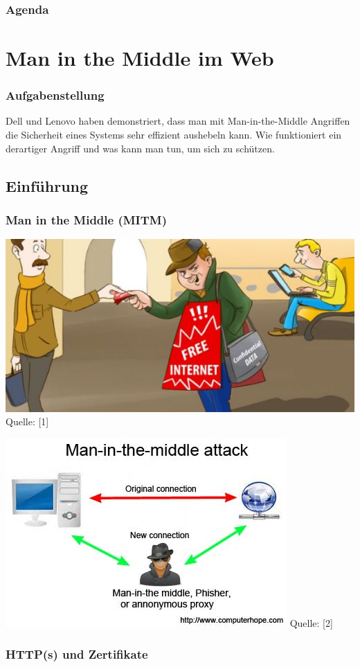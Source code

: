 \documentclass{beamer}
\begin{document}
	\begin{frame} %
		\frametitle{Agenda}
		\tableofcontents
	\end{frame}
	
	\section{Man in the Middle im Web}
	
		\begin{frame}
			\frametitle{Aufgabenstellung}
			Dell und Lenovo haben demonstriert, dass man mit Man-in-the-Middle
			Angriffen die Sicherheit eines Systems sehr effizient aushebeln kann.
			Wie funktioniert ein derartiger Angriff und was kann man tun, um sich
			zu schützen.
	    \end{frame}
	     \subsection*{Einführung}
	     \begin{frame}
	     	\frametitle{Man in the Middle (MITM)}
	     	\begin{minipage}[t]{0.8\linewidth}
	     		\includegraphics[width=0.8\linewidth]{images_fabian/mitm.jpg}
	     		\newline Quelle: [1]
	     	\end{minipage}%
	     	\hfill
	     	\begin{minipage}[t]{0.7\linewidth}
	     		\includegraphics[width=0.8\linewidth]{images_fabian/mitm2.jpg}
	     		\newline Quelle: [2]
	     	\end{minipage}
	     \end{frame}
	     \begin{frame}
	     	\frametitle{HTTP(s) und Zertifikate}
	     	
	     \end{frame}
    
\end{document}
